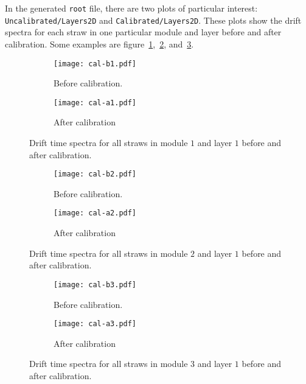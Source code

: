In the generated \verb|root| file, there are two plots of particular interest: \verb|Uncalibrated/Layers2D| and \verb|Calibrated/Layers2D|. These plots show the drift spectra for each straw in one particular module and layer before and after calibration. Some examples are figure~\ref{fig:layer2D-1},~\ref{fig:layer2D-2}, and~\ref{fig:layer2D-3}.
\begin{figure}[ht]
	\centering
	\begin{subfigure}[t]{0.7\textwidth}
	\begin{center}
	\texttt{[image: cal-b1.pdf]}
	\end{center}
	\caption{Before calibration. }
	\end{subfigure}
	\begin{subfigure}[t]{0.7\textwidth}
	\begin{center}
	\texttt{[image: cal-a1.pdf]}
	\end{center}
	\caption{After calibration}
	\end{subfigure}
	\caption{Drift time spectra for all straws in module $1$ and layer $1$ before and after calibration.}%
	\label{fig:layer2D-1}
\end{figure}
\begin{figure}[ht]
	\centering
	\begin{subfigure}[t]{0.7\textwidth}
	\begin{center}
	\texttt{[image: cal-b2.pdf]}
	\end{center}
	\caption{Before calibration. }
	\end{subfigure}
	\begin{subfigure}[t]{0.7\textwidth}
	\begin{center}
	\texttt{[image: cal-a2.pdf]}
	\end{center}
	\caption{After calibration}
	\end{subfigure}
	\caption{Drift time spectra for all straws in module $2$ and layer $1$ before and after calibration.}%
	\label{fig:layer2D-2}
\end{figure}
\begin{figure}[ht]
	\centering
	\begin{subfigure}[t]{0.7\textwidth}
	\begin{center}
	\texttt{[image: cal-b3.pdf]}
	\end{center}
	\caption{Before calibration. }
	\end{subfigure}
	\begin{subfigure}[t]{0.7\textwidth}
	\begin{center}
	\texttt{[image: cal-a3.pdf]}
	\end{center}
	\caption{After calibration}
	\end{subfigure}
	\caption{Drift time spectra for all straws in module $3$ and layer $1$ before and after calibration.}%
	\label{fig:layer2D-3}
\end{figure}

